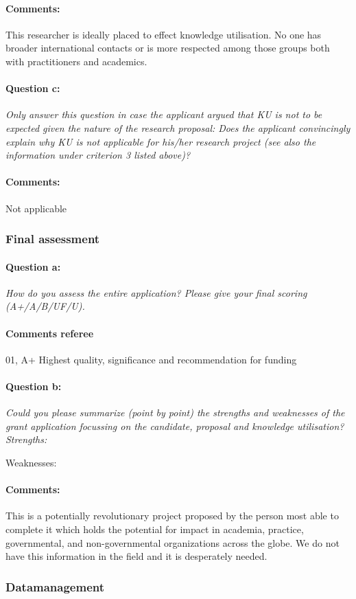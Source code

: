 \documentclass[twocolumn, serif, rga, numeric]{jote-article}
\begin{document}
\paragraph{Comments:}
This researcher is ideally placed to effect knowledge utilisation. No one has broader international contacts or is more respected among those groups both with practitioners and academics.
\paragraph{Question c:}
\textit{Only answer this question in case the applicant argued that KU is not to be expected given the nature of the research proposal: Does the applicant convincingly explain why KU is not applicable for his/her research project (see also the information under criterion 3 listed above)?}
\paragraph{Comments:}
Not applicable
 {}\subsubsection*{Final assessment} 
\paragraph{Question a:}
\textit{How do you assess the entire application? Please give your final scoring (A+/A/B/UF/U).}
\paragraph{Comments referee}
01, A+ Highest quality, significance and recommendation for funding
\paragraph{Question b:}
\textit{Could you please summarize (point by point) the strengths and weaknesses of the grant application focussing on the candidate, proposal and knowledge utilisation? Strengths:}

\noindent Weaknesses:
\paragraph{Comments:}
This is a potentially revolutionary project proposed by the person most able to complete it which holds the potential for impact in academia, practice, governmental, and non-governmental organizations across the globe. We do not have this information in the field and it is desperately needed.
 {}\subsubsection*{Datamanagement} 
\end{document}
